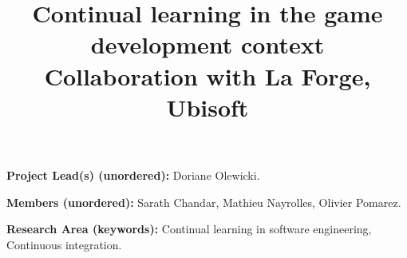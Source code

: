 \documentclass{article}
\title{Continual learning in the game development context\\Collaboration with La Forge, Ubisoft }
\begin{document}
\maketitle

\textbf{Project Lead(s) (unordered):} Doriane Olewicki.

\textbf{Members (unordered):} Sarath Chandar, Mathieu Nayrolles, Olivier Pomarez.

\textbf{Research Area (keywords):} Continual learning in software engineering, Continuous integration.







% 

\end{document}
